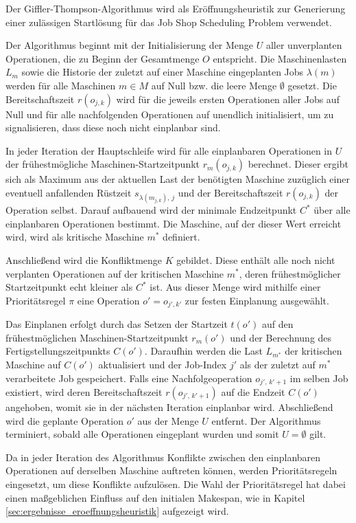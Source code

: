 Der Giffler-Thompson-Algorithmus \cite{giffler_algorithms_1960} wird als Eröffnungsheuristik zur Generierung einer zulässigen Startlösung für das Job Shop Scheduling Problem verwendet.

Der Algorithmus beginnt mit der Initialisierung der Menge $U$ aller unverplanten Operationen, die zu Beginn der Gesamtmenge $O$ entspricht.
Die Maschinenlasten $L_m$ sowie die Historie der zuletzt auf einer Maschine eingeplanten Jobs $\lambda(m)$ werden für alle Maschinen $m \in M$ auf Null bzw. die leere Menge $\emptyset$ gesetzt.
Die Bereitschaftszeit $r(o_{j,k})$ wird für die jeweils ersten Operationen aller Jobs auf Null und für alle nachfolgenden Operationen auf unendlich initialisiert, um zu signalisieren, dass diese noch nicht einplanbar sind.

In jeder Iteration der Hauptschleife wird für alle einplanbaren Operationen in $U$ der frühestmögliche Maschinen-Startzeitpunkt $r_m(o_{j,k})$ berechnet.
Dieser ergibt sich als Maximum aus der aktuellen Last der benötigten Maschine zuzüglich einer eventuell anfallenden Rüstzeit $s_{\lambda(m_{j,k}),\, j}$ und der Bereitschaftszeit $r(o_{j,k})$ der Operation selbst.
Darauf aufbauend wird der minimale Endzeitpunkt $C^*$ über alle einplanbaren Operationen bestimmt.
Die Maschine, auf der dieser Wert erreicht wird, wird als kritische Maschine $m^*$ definiert.

Anschließend wird die Konfliktmenge $K$ gebildet. Diese enthält alle noch nicht verplanten Operationen auf der kritischen Maschine $m^*$, deren frühestmöglicher Startzeitpunkt echt kleiner als $C^*$ ist.
Aus dieser Menge wird mithilfe einer Prioritätsregel $\pi$ eine Operation $o' = o_{j',k'}$ zur festen Einplanung ausgewählt.

Das Einplanen erfolgt durch das Setzen der Startzeit $t(o')$ auf den frühestmöglichen Maschinen-Startzeitpunkt $r_m(o')$ und der Berechnung des Fertigstellungszeitpunkts $C(o')$.
Daraufhin werden die Last $L_{m^*}$ der kritischen Maschine auf $C(o')$ aktualisiert und der Job-Index $j'$ als der zuletzt auf $m^*$ verarbeitete Job gespeichert.
Falls eine Nachfolgeoperation $o_{j',\, k'+1}$ im selben Job existiert, wird deren Bereitschaftszeit $r(o_{j',\, k'+1})$ auf die Endzeit $C(o')$ angehoben, womit sie in der nächsten Iteration einplanbar wird.
Abschließend wird die geplante Operation $o'$ aus der Menge $U$ entfernt.
Der Algorithmus terminiert, sobald alle Operationen eingeplant wurden und somit $U = \emptyset$ gilt.

Da in jeder Iteration des Algorithmus Konflikte zwischen den einplanbaren Operationen auf derselben Maschine auftreten können, werden Prioritätsregeln eingesetzt, um diese Konflikte aufzulösen.
Die Wahl der Prioritätsregel hat dabei einen maßgeblichen Einfluss auf den initialen Makespan, wie in Kapitel \ref{sec:ergebnisse_eroeffnungsheuristik} aufgezeigt wird.

